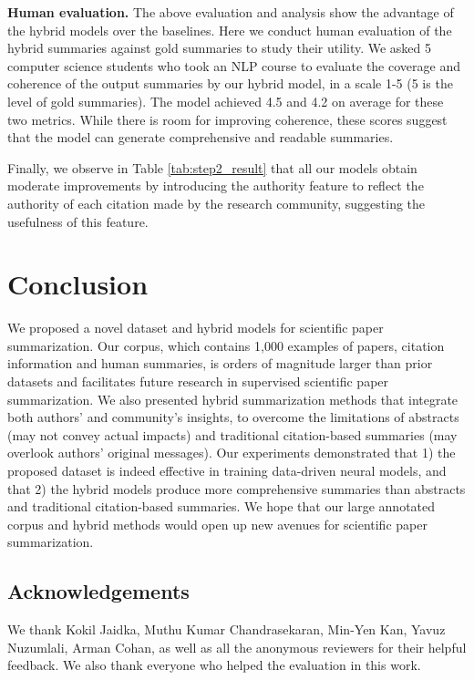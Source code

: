 \documentclass[letterpaper]{article} \usepackage{aaai19}  \usepackage{times}  \usepackage{helvet}  \usepackage{courier}  \usepackage{url}
\begin{document}
\textbf{Human evaluation.}
The above evaluation and analysis show the advantage of the hybrid models over the baselines.
Here we conduct human evaluation of the hybrid summaries against gold summaries to study their utility.
We asked 5 computer science students who took an NLP course to evaluate the coverage and coherence of the output summaries by our hybrid model, in a scale 1-5 (5 is the level of gold summaries).
The model achieved 4.5 and 4.2 on average for these two metrics. While there is room for improving coherence, these scores suggest that the model can generate comprehensive and readable summaries.


Finally, we observe in Table \ref{tab:step2_result} that all our models obtain moderate improvements by introducing the authority feature to reflect the authority of each citation made by the research community, suggesting the usefulness of this feature.







\section{Conclusion}
We proposed a novel dataset and hybrid models for scientific paper summarization.
Our corpus,
which contains
1,000 examples of papers, citation information and human summaries,
is orders of magnitude larger than prior datasets and facilitates future research in supervised scientific paper summarization.
We also presented hybrid summarization methods that integrate both authors' and
community's insights,
to
overcome the limitations of abstracts (may not convey actual impacts) and traditional citation-based summaries (may overlook authors' original messages).
Our experiments demonstrated that 1) the proposed dataset is indeed effective in training data-driven neural models,
and
that 2) the hybrid models produce more comprehensive summaries than abstracts and traditional citation-based summaries.
We hope that our large
annotated corpus and hybrid methods would open up new
avenues for scientific paper summarization.





\subsection*{Acknowledgements}
We thank Kokil Jaidka, Muthu Kumar Chandrasekaran, Min-Yen Kan, Yavuz Nuzumlali, Arman Cohan, as well as all the anonymous reviewers for their helpful feedback.
We also thank everyone who helped the evaluation in this work.







\end{document}

